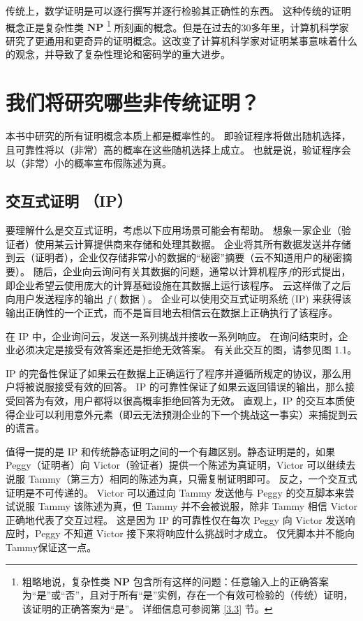 传统上，数学证明是可以逐行撰写并逐行检验其正确性的东西。 这种传统的证明概念正是复杂性类 $\mathbf{N P}$ \footnote{粗略地说，复杂性类 $\mathbf{N P}$ 包含所有这样的问题：任意输入上的正确答案为“是”或“否”，且对于所有“是”实例，存在一个有效可检验的（传统）证明，该证明的正确答案为“是”。 详细信息可参阅第 \ref{3.3} 节。} 所刻画的概念。但是在过去的30多年里，计算机科学家研究了更通用和更奇异的证明概念。这改变了计算机科学家对证明某事意味着什么的观念，并导致了复杂性理论和密码学的重大进步。


\section{我们将研究哪些非传统证明？}
本书中研究的所有证明概念本质上都是概率性的。
即验证程序将做出随机选择，且可靠性将以（非常）高的概率在这些随机选择上成立。 
也就是说，验证程序会以（非常）小的概率宣布假陈述为真。

\subsection{交互式证明 （IP）}
要理解什么是交互式证明，考虑以下应用场景可能会有帮助。 想象一家企业（验证者）使用某云计算提供商来存储和处理其数据。 
企业将其所有数据发送并存储到云（证明者），企业仅存储非常小的数据的“秘密”摘要（云不知道用户的秘密摘要）。 
随后，企业向云询问有关其数据的问题，通常以计算机程序$f$的形式提出，即企业希望云使用庞大的计算基础设施在其数据上运行该程序。 
云这样做了之后向用户发送程序的输出 $f(\text{数据})$。 企业可以使用交互式证明系统 (IP) 来获得该输出正确性的一个正式，而不是盲目地去相信云在数据上正确执行了该程序。

在 IP 中，企业询问云，发送一系列挑战并接收一系列响应。 在询问结束时，企业必须决定是接受有效答案还是拒绝无效答案。 有关此交互的图，请参见图 1.1。

IP 的完备性保证了如果云在数据上正确运行了程序并遵循所规定的协议，那么用户将被说服接受有效的回答。 IP 的可靠性保证了如果云返回错误的输出，那么接受回答为有效，用户都将以很高概率拒绝回答为无效。 直观上，IP 的交互本质使得企业可以利用意外元素（即云无法预测企业的下一个挑战这一事实）来捕捉到云的谎言。

值得一提的是 IP 和传统静态证明之间的一个有趣区别。静态证明是的，如果 Peggy（证明者）向 Victor（验证者）提供一个陈述为真证明，Victor 可以继续去说服 Tammy（第三方）相同的陈述为真，只需复制证明即可。 反之，一个交互式证明是不可传递的。 Victor 可以通过向 Tammy 发送他与 Peggy 的交互脚本来尝试说服 Tammy 该陈述为真，但 Tammy 并不会被说服，除非 Tammy 相信 Victor 正确地代表了交互过程。 这是因为 IP 的可靠性仅在每次 Peggy 向 Victor 发送响应时，Peggy 不知道 Victor 接下来将响应什么挑战时才成立。 仅凭脚本并不能向Tammy保证这一点。

